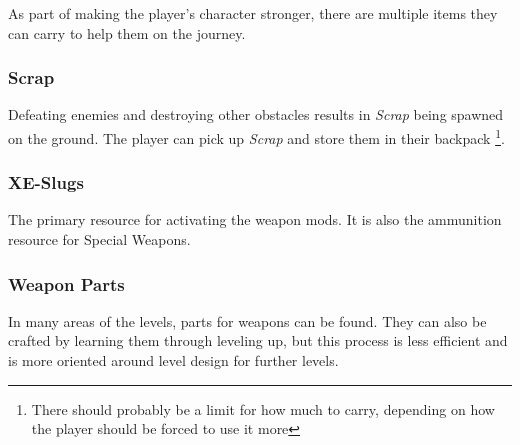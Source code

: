 \documentclass[../Main.tex]{subfiles}
\begin{document}
As part of making the player's character stronger, there are multiple items they can carry to help them on the journey.

\subsubsection{Scrap}

Defeating enemies and destroying other obstacles results in \emph{Scrap} being spawned on the ground. The player can pick up \emph{Scrap} and store them in their backpack \footnote{There should probably be a limit for how much to carry, depending on how the player should be forced to use it more}. 

\subsubsection{XE-Slugs}

The primary resource for activating the weapon mods. It is also the ammunition resource for Special Weapons.

\subsubsection{Weapon Parts}

In many areas of the levels, parts for weapons can be found. They can also be crafted by learning them through leveling up, but this process is less efficient and is more oriented around level design for further levels.
\end{document}

